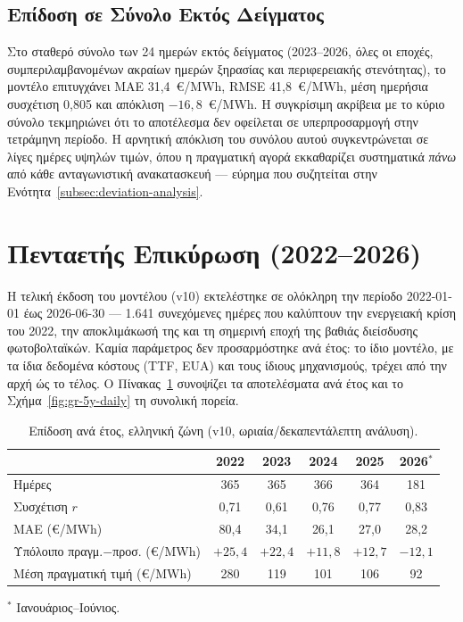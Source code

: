 \subsection{Επίδοση σε Σύνολο Εκτός Δείγματος}
\label{subsec:heldout-results}

Στο σταθερό σύνολο των 24 ημερών εκτός δείγματος (2023--2026, όλες οι εποχές, συμπεριλαμβανομένων ακραίων ημερών ξηρασίας και περιφερειακής στενότητας), το μοντέλο επιτυγχάνει MAE 31,4~€/MWh, RMSE 41,8~€/MWh, μέση ημερήσια συσχέτιση 0,805 και απόκλιση $-16{,}8$~€/MWh. Η συγκρίσιμη ακρίβεια με το κύριο σύνολο τεκμηριώνει ότι το αποτέλεσμα δεν οφείλεται σε υπερπροσαρμογή στην τετράμηνη περίοδο. Η αρνητική απόκλιση του συνόλου αυτού συγκεντρώνεται σε λίγες ημέρες υψηλών τιμών, όπου η πραγματική αγορά εκκαθαρίζει συστηματικά \emph{πάνω} από κάθε ανταγωνιστική ανακατασκευή --- εύρημα που συζητείται στην Ενότητα~\ref{subsec:deviation-analysis}.

\section{Πενταετής Επικύρωση (2022--2026)}
\label{sec:fiveyear-validation}

Η τελική έκδοση του μοντέλου (v10) εκτελέστηκε σε ολόκληρη την περίοδο
2022-01-01 έως 2026-06-30 --- 1.641 συνεχόμενες ημέρες που καλύπτουν την
ενεργειακή κρίση του 2022, την αποκλιμάκωσή της και τη σημερινή εποχή της
βαθιάς διείσδυσης φωτοβολταϊκών. Καμία παράμετρος δεν προσαρμόστηκε ανά
έτος: το ίδιο μοντέλο, με τα ίδια δεδομένα κόστους (TTF, EUA) και τους
ίδιους μηχανισμούς, τρέχει από την αρχή ώς το τέλος. Ο
Πίνακας~\ref{tab:fiveyear} συνοψίζει τα αποτελέσματα ανά έτος και το
Σχήμα~\ref{fig:gr-5y-daily} τη συνολική πορεία.

\begin{table}[htbp]
\centering
\caption{Επίδοση ανά έτος, ελληνική ζώνη (v10, ωριαία/δεκαπεντάλεπτη ανάλυση).}
\label{tab:fiveyear}
\begin{tabular}{lccccc}
\toprule
& \textbf{2022} & \textbf{2023} & \textbf{2024} & \textbf{2025} & \textbf{2026}$^{*}$ \\
\midrule
Ημέρες & 365 & 365 & 366 & 364 & 181 \\
Συσχέτιση $r$ & 0,71 & 0,61 & 0,76 & 0,77 & 0,83 \\
MAE (€/MWh) & 80,4 & 34,1 & 26,1 & 27,0 & 28,2 \\
Υπόλοιπο πραγμ.$-$προσ. (€/MWh) & $+25{,}4$ & $+22{,}4$ & $+11{,}8$ & $+12{,}7$ & $-12{,}1$ \\
Μέση πραγματική τιμή (€/MWh) & 280 & 119 & 101 & 106 & 92 \\
\bottomrule
\end{tabular}

\vspace{0.3em}
{\footnotesize $^{*}$ Ιανουάριος--Ιούνιος.}
\end{table}

